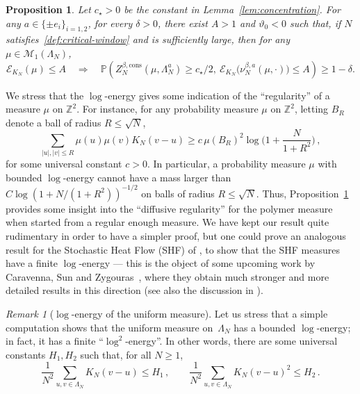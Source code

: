 \documentclass[11pt]{amsart}
\numberwithin{equation}{section}
\newcommand*{\numberset}{\mathbb}
\newcommand*{\Z}{\numberset{Z}}
\newcommand*{\cons}{\mathrm{cons}}
\theoremstyle{plain}
\newtheorem{proposition}[theorem]{Proposition}
\theoremstyle{definition}
\theoremstyle{remark}
\newtheorem{remark}[theorem]{Remark}
\begin{document}
\begin{proposition}
\label{prop:logregularity-propagation}
Let \(c_{\star}>0\) be the constant in Lemma~\ref{lem:concentration}.
For any $a\in\{\pm e_i\}_{i=1,2}$, for every $\delta>0$, there exist $A>1$ and $\vartheta_0<0$ such that, if  $N$ satisfies~\eqref{def:critical-window} and is sufficiently large, then for any $\mu \in \mathcal{M}_1(\Lambda_N)$,
$$
\mathcal{E}_{K_N}(\mu) \leq A 
\quad \Longrightarrow \quad 
\mathbb{P}\left(
Z_N^{\beta,\cons}(\mu,\Lambda_N^a)\ge c_\star/2,\ 
\mathcal{E}_{K_N}\big(\nu_N^{\beta,a}(\mu,\cdot) \big) \leq A
\right) \ge 1-\delta.
$$
\end{proposition}



We stress that the \(\log\)-energy gives some indication of the ``regularity'' of a measure \(\mu\) on \(\Z^2\).
For instance, for any probability measure \(\mu\) on \(\Z^2\), letting \(B_R\) denote a ball of radius \(R\leq \sqrt{N}\),
\[
\sum_{|u|,|v| \leq R} \mu(u)\mu(v) K_N(v-u) \geq c\,\mu(B_R)^2 \log\Big(1+\frac{N}{1+R^2}\Big) \,,
\]
for some universal constant \(c>0\).
In particular, a probability measure \(\mu\) with bounded \(\log\)-energy cannot have a mass larger than \(C \log(1+N/(1+R^2))^{-1/2}\) on balls of radius \(R\leq \sqrt{N}\).
Thus, Proposition~\ref{prop:logregularity-propagation} provides some insight into the ``diffusive regularity'' for the polymer measure when started from a regular enough measure. 
We have kept our result quite rudimentary in order to have a simpler proof, but one could prove an analogous result for the Stochastic Heat Flow (SHF) of \cite{CSZ23}, to show that the SHF measures have a finite \(\log\)-energy --- this is the object of some upcoming work by Caravenna, Sun and Zygouras~\cite{CSZ-next}, where they obtain much stronger and more detailed results in this direction (see also the discussion in \cite[\S10.2]{CSZ24-rev}).

\begin{remark}[\(\log\)-energy of the uniform measure]
       \label{rem:energy-unif}
       Let us stress that a simple computation shows that the uniform measure on~\(\Lambda_N\) has a bounded \(\log\)-energy; in fact, it has a finite ``\(\log^2\)-energy''.
       In other words, there are some universal constants \(H_1,H_2\) such that, for all \(N\geq 1\),
       \[
        \frac{1}{N^2} \sum_{u,v \in \Lambda_N} K_N(v-u)  \leq H_1 \,,\qquad \frac{1}{N^2} \sum_{u,v \in \Lambda_N} K_N(v-u)^2  \leq H_2 \,.
       \]
\end{remark}
\end{document}
